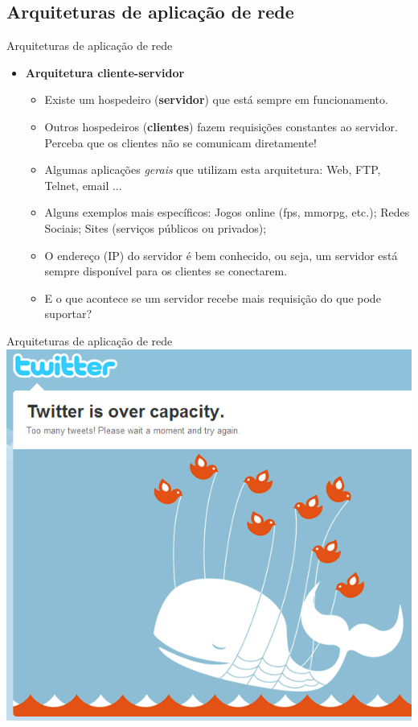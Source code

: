 \documentclass{libs/ufc_format}
\begin{document}
\subsection{Arquiteturas de aplicação de rede}

\begin{frame}{Arquiteturas de aplicação de rede}
    \begin{itemize}
        \item \textbf{Arquitetura cliente-servidor}
            \begin{itemize}
                \justifying
                \item Existe um hospedeiro (\textbf{servidor}) que está sempre em funcionamento.
                \item<2-> Outros hospedeiros (\textbf{clientes}) fazem requisições constantes ao servidor. Perceba que os clientes não se comunicam diretamente!
                \item<3-> Algumas aplicações \textit{gerais} que utilizam esta arquitetura: Web, FTP, Telnet, email ...
                \item<4-> Alguns exemplos mais específicos: Jogos online (fps, mmorpg, etc.); Redes Sociais; Sites (serviços públicos ou privados);
                \item<5-> O endereço (IP) do servidor é bem conhecido, ou seja, um servidor está sempre disponível para os clientes se conectarem.
                \item<6> E o que acontece se um servidor recebe mais requisição do que pode suportar?
            \end{itemize}
    \end{itemize}
\end{frame}

\begin{frame}{Arquiteturas de aplicação de rede}
    \centering
    \includegraphics[scale = 0.5]{figuras/figura02_01}
\end{frame}
\end{document}
